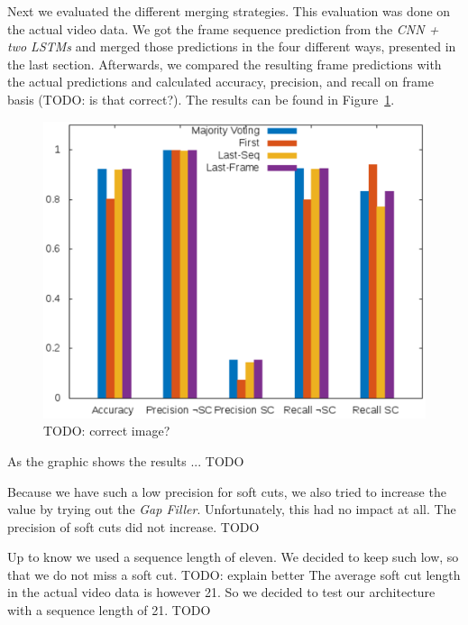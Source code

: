 Next we evaluated the different merging strategies.
This evaluation was done on the actual video data.
We got the frame sequence prediction from the \textit{CNN + two LSTMs} and merged those predictions in the four different ways, presented in the last section.
Afterwards, we compared the resulting frame predictions with the actual predictions and calculated accuracy, precision, and recall on frame basis (TODO: is that correct?).
The results can be found in Figure~\ref{fig:evaluation_net}.
\begin{figure}[!htb]
	\centering
	\includegraphics[scale=.7]{images/evalutation_net.eps}
	\caption{TODO: correct image?}
	\label{fig:evaluation_net}
\end{figure}
As the graphic shows the results ... TODO

Because we have such a low precision for soft cuts, we also tried to increase the value by trying out the \textit{Gap Filler}.
Unfortunately, this had no impact at all.
The precision of soft cuts did not increase.
TODO

Up to know we used a sequence length of eleven.
We decided to keep such low, so that we do not miss a soft cut.
TODO: explain better
The average soft cut length in the actual video data is however 21.
So we decided to test our architecture with a sequence length of 21.
TODO



